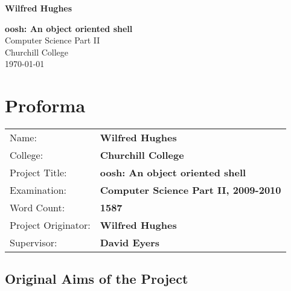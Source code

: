 \documentclass[12pt,twoside,notitlepage]{report}
\begin{document}





\pagestyle{empty}

\hfill{\LARGE \bf Wilfred Hughes}

\vspace*{60mm}
\begin{center}
\Huge
{\bf oosh: An object oriented shell} \\
\vspace*{5mm}
Computer Science Part II \\
\vspace*{5mm}
Churchill College \\
\vspace*{5mm}
\today  %
\end{center}

\cleardoublepage


\setcounter{page}{1}
\pagestyle{plain}

\chapter*{Proforma}

{\large
\begin{tabular}{ll}
Name:               & \bf Wilfred Hughes                       \\
College:            & \bf Churchill College                     \\
Project Title:      & \bf oosh: An object oriented shell \\
Examination:        & \bf Computer Science Part II, 2009-2010        \\
Word Count:         & \bf 1587\footnotemark[1] \\
Project Originator: & \bf Wilfred Hughes                    \\
Supervisor:         & \bf David Eyers                    \\ 
\end{tabular}
}



\section*{Original Aims of the Project}
\end{document}
